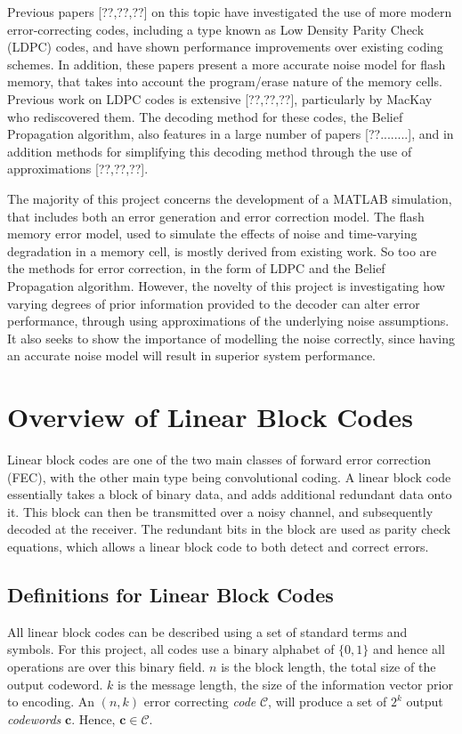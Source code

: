\documentclass[11pt]{article}
\numberwithin{equation}{subsection}
\begin{document}
Previous papers [??,??,??] on this topic have investigated the use of more modern error-correcting codes, including a type known as Low Density Parity Check (LDPC) codes, and have shown performance improvements over existing coding schemes. In addition, these papers present a more accurate noise model for flash memory, that takes into account the program/erase nature of the memory cells. Previous work on LDPC codes is extensive [??,??,??], particularly by MacKay who rediscovered them. The decoding method for these codes, the Belief Propagation algorithm, also features in a large number of papers [??........], and in addition methods for simplifying this decoding method through the use of approximations [??,??,??].

The majority of this project concerns the development of a MATLAB simulation, that includes both an error generation and error correction model. The flash memory error model, used to simulate the effects of noise and time-varying degradation in a memory cell, is mostly derived from existing work. So too are the methods for error correction, in the form of LDPC and the Belief Propagation algorithm. However, the novelty of this project is investigating how varying degrees of prior information provided to the decoder can alter error performance, through using approximations of the underlying noise assumptions. It also seeks to show the importance of modelling the noise correctly, since having an accurate noise model will result in superior system performance.

\section{Overview of Linear Block Codes}

Linear block codes are one of the two main classes of forward error correction (FEC), with the other main type being convolutional coding. A linear block code essentially takes a block of binary data, and adds additional redundant data onto it. This block can then be transmitted over a noisy channel, and subsequently decoded at the receiver. The redundant bits in the block are used as parity check equations, which allows a linear block code to both detect and correct errors. 

\subsection{Definitions for Linear Block Codes} \label{3.1:definitions}
All linear block codes can be described using a set of standard terms and symbols. For this project, all codes use a binary alphabet of $\{0,1\}$ and hence all operations are over this binary field. $n$ is the block length, the total size of the output codeword. $k$ is the message length, the size of the information vector prior to encoding. An $(n,k)$ error correcting \textit{code} $\mathcal{C}$, will produce a set of $2^k$ output \textit{codewords} $\mathbf{c}$. Hence, $\mathbf{c} \in \mathcal{C}$. 
\end{document}
